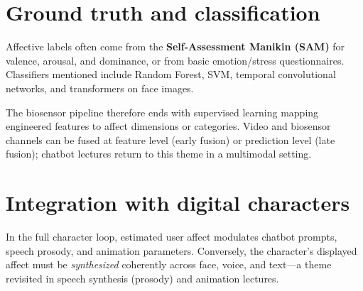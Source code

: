 \section{Ground truth and classification}

Affective labels often come from the \textbf{Self-Assessment Manikin (SAM)} for valence, arousal, and dominance, or from basic emotion/stress questionnaires. Classifiers mentioned include Random Forest, SVM, temporal convolutional networks, and transformers on face images.

The biosensor pipeline therefore ends with supervised learning mapping engineered features to affect dimensions or categories. Video and biosensor channels can be fused at feature level (early fusion) or prediction level (late fusion); chatbot lectures return to this theme in a multimodal setting.

\section{Integration with digital characters}

In the full character loop, estimated user affect modulates chatbot prompts, speech prosody, and animation parameters. Conversely, the character's displayed affect must be \emph{synthesized} coherently across face, voice, and text---a theme revisited in speech synthesis (prosody) and animation lectures.

